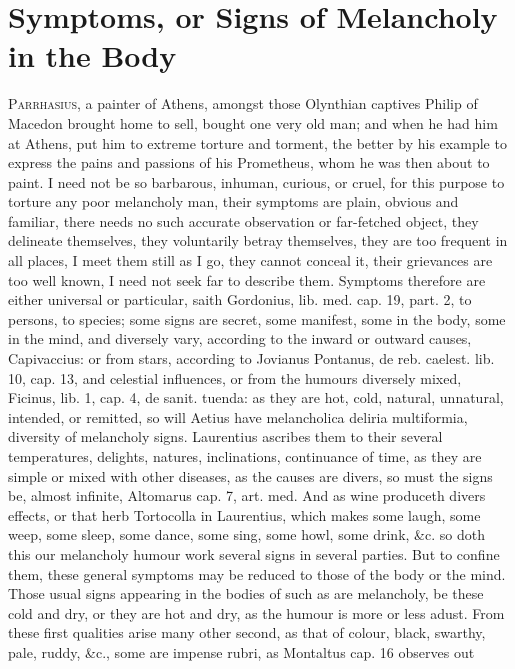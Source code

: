 \chapter[Symptoms of Melancholy]{Symptoms, or Signs of Melancholy in the Body}
{
\lettrine{P}{arrhasius}, a painter of Athens, amongst those Olynthian captives
Philip of Macedon brought home to sell, bought one very old man;
and when he had him at Athens, put him to extreme torture and torment,
the better by his example to express the pains and passions of his
Prometheus, whom he was then about to paint. I need not be so
barbarous, inhuman, curious, or cruel, for this purpose to torture any
poor melancholy man, their symptoms are plain, obvious and familiar,
there needs no such accurate observation or far-fetched object, they
delineate themselves, they voluntarily betray themselves, they are too
frequent in all places, I meet them still as I go, they cannot conceal
it, their grievances are too well known, I need not seek far to
describe them.
Symptoms therefore are either universal or particular, saith
Gordonius, lib. med. cap. 19, part. 2, to persons, to species; some
signs are secret, some manifest, some in the body, some in the mind,
and diversely vary, according to the inward or outward causes,
Capivaccius: or from stars, according to Jovianus Pontanus, de reb.
caelest. lib. 10, cap. 13, and celestial influences, or from the
humours diversely mixed, Ficinus, lib. 1, cap. 4, de sanit. tuenda: as
they are hot, cold, natural, unnatural, intended, or remitted, so will
Aetius have melancholica deliria multiformia, diversity of melancholy
signs. Laurentius ascribes them to their several temperatures,
delights, natures, inclinations, continuance of time, as they are
simple or mixed with other diseases, as the causes are divers, so must
the signs be, almost infinite, Altomarus cap. 7, art. med. And as wine
produceth divers effects, or that herb Tortocolla in Laurentius,
which makes some laugh, some weep, some sleep, some dance, some sing,
some howl, some drink, \&c. so doth this our melancholy humour work
several signs in several parties.
But to confine them, these general symptoms may be reduced to those of
the body or the mind. Those usual signs appearing in the bodies of such
as are melancholy, be these cold and dry, or they are hot and dry, as
the humour is more or less adust. From these first qualities
arise many other second, as that of colour, black, swarthy, pale,
ruddy, \&c., some are impense rubri, as Montaltus cap. 16 observes out
}
